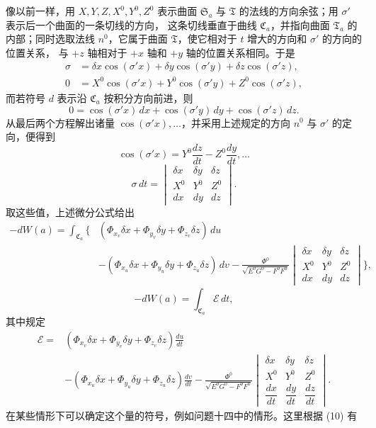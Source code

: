\documentclass[11pt,a4paper,leqno]{article}
\begin{document}
像以前一样，用 $X,Y,Z,X^0,Y^0,Z^0$ 表示曲面 $\mathfrak{S}_a$ 与
$\mathfrak{T}$ 的法线的方向余弦；用 $\sigma'$ 表示后一个曲面的一条切线的方向，
这条切线垂直于曲线 $\mathfrak{C}_a$，并指向曲面 $\mathfrak{T}_a$ 的内部；同时选取法线
$n^0$，它属于曲面 $\mathfrak{T}$，使它相对于 $t$ 增大的方向和 $\sigma'$ 的方向的位置关系，
与 $+z$ 轴相对于 $+x$ 轴和 $+y$ 轴的位置关系相同。于是
\[
\begin{aligned}
\sigma&=\delta x\cos(\sigma'x)+\delta y\cos(\sigma'y)
        +\delta z\cos(\sigma'z),\\
0&=X^0\cos(\sigma'x)+Y^0\cos(\sigma'y)+Z^0\cos(\sigma'z),
\end{aligned}
\]
而若符号 $d$ 表示沿 $\mathfrak{C}_a$ 按积分方向前进，则
\[
0=\cos(\sigma'x)\,dx+\cos(\sigma'y)\,dy+\cos(\sigma'z)\,dz.
\]
从最后两个方程解出诸量 $\cos(\sigma'x),\ldots$，并采用上述规定的方向
$n^0$ 与 $\sigma'$ 的定向，便得到
\[
\cos(\sigma'x)=Y^0\frac{dz}{dt}-Z^0\frac{dy}{dt},\ldots
\]
\begin{equation}\tag{48}
\sigma\,dt=
\begin{vmatrix}
\delta x&\delta y&\delta z\\
X^0&Y^0&Z^0\\
dx&dy&dz
\end{vmatrix}.
\end{equation}
取这些值，上述微分公式给出
\[
\begin{aligned}
-dW(a)=\int_{\mathfrak{C}_a}\Bigg\{&
(\Phi_{x_v}\delta x+\Phi_{y_v}\delta y+\Phi_{z_v}\delta z)\,du\\
&-(\Phi_{x_u}\delta x+\Phi_{y_u}\delta y+\Phi_{z_u}\delta z)\,dv
-\frac{\Phi^0}{\sqrt{E^0G^0-F^0F^0}}
\begin{vmatrix}
\delta x&\delta y&\delta z\\
X^0&Y^0&Z^0\\
dx&dy&dz
\end{vmatrix}\Bigg\},
\end{aligned}
\]
\[
-dW(a)=\int_{\mathfrak{C}_a}\mathcal{E}\,dt,
\]
其中规定
\begin{equation}\tag{49}
\begin{aligned}
\mathcal{E}={}&
(\Phi_{x_v}\delta x+\Phi_{y_v}\delta y+\Phi_{z_v}\delta z)\frac{du}{dt}\\
&-(\Phi_{x_u}\delta x+\Phi_{y_u}\delta y+\Phi_{z_u}\delta z)\frac{dv}{dt}
-\frac{\Phi^0}{\sqrt{E^0G^0-F^0F^0}}
\begin{vmatrix}
\delta x&\delta y&\delta z\\
X^0&Y^0&Z^0\\
\dfrac{dx}{dt}&\dfrac{dy}{dt}&\dfrac{dz}{dt}
\end{vmatrix}.
\end{aligned}
\end{equation}
在某些情形下可以确定这个量的符号，例如问题十四中的情形。这里根据 (10) 有
\end{document}
